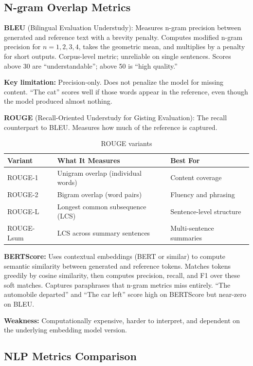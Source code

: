 \subsection{N-gram Overlap Metrics}

\textbf{BLEU} (Bilingual Evaluation Understudy): Measures n-gram precision between generated and reference text with a brevity penalty. Computes modified n-gram precision for $n = 1, 2, 3, 4$, takes the geometric mean, and multiplies by a penalty for short outputs. Corpus-level metric; unreliable on single sentences. Scores above 30 are ``understandable''; above 50 is ``high quality.''

\textbf{Key limitation:} Precision-only. Does not penalize the model for missing content. ``The cat'' scores well if those words appear in the reference, even though the model produced almost nothing.

\textbf{ROUGE} (Recall-Oriented Understudy for Gisting Evaluation): The recall counterpart to BLEU. Measures how much of the reference is captured.

\begin{table}[H]
\centering
\caption{ROUGE variants}
\begin{tabularx}{\textwidth}{lXX}
\toprule
\textbf{Variant} & \textbf{What It Measures} & \textbf{Best For} \\
\midrule
ROUGE-1 & Unigram overlap (individual words) & Content coverage \\
ROUGE-2 & Bigram overlap (word pairs) & Fluency and phrasing \\
ROUGE-L & Longest common subsequence (LCS) & Sentence-level structure \\
ROUGE-Lsum & LCS across summary sentences & Multi-sentence summaries \\
\bottomrule
\end{tabularx}
\end{table}

\textbf{BERTScore:} Uses contextual embeddings (BERT or similar) to compute semantic similarity between generated and reference tokens. Matches tokens greedily by cosine similarity, then computes precision, recall, and F1 over these soft matches. Captures paraphrases that n-gram metrics miss entirely. ``The automobile departed'' and ``The car left'' score high on BERTScore but near-zero on BLEU.

\textbf{Weakness:} Computationally expensive, harder to interpret, and dependent on the underlying embedding model version.

\subsection{NLP Metrics Comparison}

